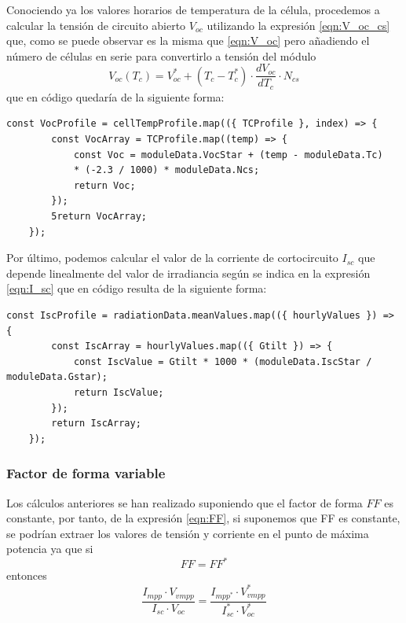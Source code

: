 Conociendo ya los valores horarios de temperatura de la célula, procedemos a calcular la tensión de circuito abierto $V_{oc}$ utilizando la expresión \ref{eqn:V_oc_cs} que, como se puede observar es la misma que \ref{eqn:V_oc} pero añadiendo el número de células en serie para convertirlo a tensión del módulo
\begin{equation}
\label{eqn:V_oc_cs}
V_{oc}(T_c) = V_{oc}^* + (T_c - T_c^*) \cdot \frac{dV_{oc}}{dT_c} \cdot N_{cs}
\end{equation}
que en código quedaría de la siguiente forma:
\begin{lstlisting}[style=ES6, caption={Cálculo de la tensión de circuito abierto}]
	const VocProfile = cellTempProfile.map(({ TCProfile }, index) => {
		const VocArray = TCProfile.map((temp) => {
			const Voc = moduleData.VocStar + (temp - moduleData.Tc) 
			* (-2.3 / 1000) * moduleData.Ncs;
			return Voc;
		});
		5return VocArray;
	});

\end{lstlisting}
\newpage
Por último, podemos calcular el valor de la corriente de cortocircuito $I_{sc}$ que depende linealmente del valor de irradiancia según se indica en la expresión \ref{eqn:I_sc} que en código resulta de la siguiente forma:

\begin{lstlisting}[style=ES6, caption={Cálculo de la corriente de cortocircuito}]
	const IscProfile = radiationData.meanValues.map(({ hourlyValues }) => {
		const IscArray = hourlyValues.map(({ Gtilt }) => {
			const IscValue = Gtilt * 1000 * (moduleData.IscStar / moduleData.Gstar);
			return IscValue;
		});
		return IscArray;
	});
\end{lstlisting}

\subsubsection{Factor de forma variable}
\label{section:var_form_factor}

Los cálculos anteriores se han realizado suponiendo que el factor de forma $FF$ es constante, por tanto, de la expresión \ref{eqn:FF}, si suponemos que FF es constante, se podrían extraer los valores de tensión y corriente en el punto de máxima potencia ya que si
\begin{equation}
FF = FF^*
\end{equation}
entonces
\begin{equation}
\frac{I_{mpp} \cdot V_{vmpp}}{I_{sc} \cdot V_{oc}} = \frac{I_{mpp^*} \cdot V_{vmpp}^*}{I_{sc}^* \cdot V_{oc}^*}
\end{equation}

